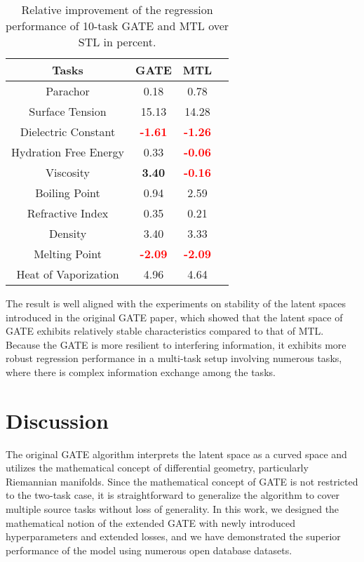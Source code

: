 \begin{table}[!ht]
\caption{Relative improvement of the regression performance of 10-task GATE and MTL over STL in percent.}
\label{percent}
\begin{center}
    \begin{tabular}{|c|c|c|c|}
    \hline
        \textbf{Tasks} & \textbf{GATE} & \textbf{MTL} \\ \hline \hline
        Parachor & 0.18 & 0.78  \\ \hline
        Surface Tension & 15.13 & 14.28  \\ \hline
        Dielectric Constant & \textbf{\textcolor{red}{-1.61}} & \textbf{\textcolor{red}{-1.26}}  \\ \hline
        Hydration Free Energy & 0.33 & \textbf{\textcolor{red}{-0.06}}  \\ \hline
        Viscosity & \textbf{3.40} & \textbf{\textcolor{red}{-0.16}}  \\ \hline
        Boiling Point & 0.94 & 2.59  \\ \hline
        Refractive Index & 0.35 & 0.21  \\ \hline
        Density & 3.40 & 3.33  \\ \hline
        Melting Point & \textbf{\textcolor{red}{-2.09}} & \textbf{\textcolor{red}{-2.09}}  \\ \hline
        Heat of Vaporization & 4.96 & 4.64  \\ \hline
    \end{tabular}
\end{center}
\end{table}
  
  The result is well aligned with the experiments on stability of the latent spaces introduced in the original GATE paper\cite{ko2023geometrically}, which showed that the latent space of GATE exhibits relatively stable characteristics compared to that of MTL. Because the GATE is more resilient to interfering information, it exhibits more robust regression performance in a multi-task setup involving numerous tasks, where there is complex information exchange among the tasks.  


\section{Discussion}
The original GATE algorithm interprets the latent space as a curved space and utilizes the mathematical concept of differential geometry, particularly Riemannian manifolds. Since the mathematical concept of GATE is not restricted to the two-task case, it is straightforward to generalize the algorithm to cover multiple source tasks without loss of generality. In this work, we designed the mathematical notion of the extended GATE with newly introduced hyperparameters and extended losses, and we have demonstrated the superior performance of the model using numerous open database datasets.

